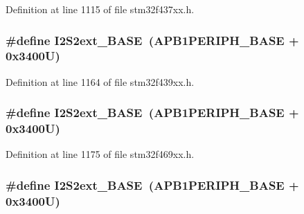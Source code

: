 Definition at line 1115 of file stm32f437xx.\+h.

\subsubsection[{\texorpdfstring{I2\+S2ext\+\_\+\+B\+A\+SE}{I2S2ext_BASE}}]{\setlength{\rightskip}{0pt plus 5cm}\#define I2\+S2ext\+\_\+\+B\+A\+SE~({\bf A\+P\+B1\+P\+E\+R\+I\+P\+H\+\_\+\+B\+A\+SE} + 0x3400\+U)}\hypertarget{group___peripheral__memory__map_gaa5f7b241ed5b756decd835300c9e7bc9}{}\label{group___peripheral__memory__map_gaa5f7b241ed5b756decd835300c9e7bc9}


Definition at line 1164 of file stm32f439xx.\+h.

\subsubsection[{\texorpdfstring{I2\+S2ext\+\_\+\+B\+A\+SE}{I2S2ext_BASE}}]{\setlength{\rightskip}{0pt plus 5cm}\#define I2\+S2ext\+\_\+\+B\+A\+SE~({\bf A\+P\+B1\+P\+E\+R\+I\+P\+H\+\_\+\+B\+A\+SE} + 0x3400\+U)}\hypertarget{group___peripheral__memory__map_gaa5f7b241ed5b756decd835300c9e7bc9}{}\label{group___peripheral__memory__map_gaa5f7b241ed5b756decd835300c9e7bc9}


Definition at line 1175 of file stm32f469xx.\+h.

\subsubsection[{\texorpdfstring{I2\+S2ext\+\_\+\+B\+A\+SE}{I2S2ext_BASE}}]{\setlength{\rightskip}{0pt plus 5cm}\#define I2\+S2ext\+\_\+\+B\+A\+SE~({\bf A\+P\+B1\+P\+E\+R\+I\+P\+H\+\_\+\+B\+A\+SE} + 0x3400\+U)}\hypertarget{group___peripheral__memory__map_gaa5f7b241ed5b756decd835300c9e7bc9}{}\label{group___peripheral__memory__map_gaa5f7b241ed5b756decd835300c9e7bc9}


